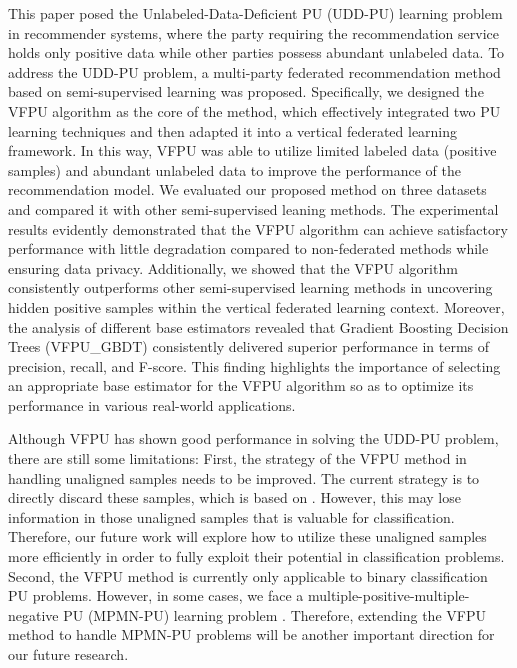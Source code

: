 \documentclass[10pt,journal,compsoc]{IEEEtran}
\begin{document}
This paper posed the Unlabeled-Data-Deficient PU (UDD-PU) learning problem in recommender systems, where the party requiring the recommendation service holds only positive data while other parties possess abundant unlabeled data. To address the UDD-PU problem, a multi-party federated recommendation method based on semi-supervised learning was proposed. Specifically, we designed the VFPU algorithm as the core of the method, which effectively integrated two PU learning techniques and then adapted it into a vertical federated learning framework. In this way, VFPU was able to utilize limited labeled data (positive samples) and abundant unlabeled data to improve the performance of the recommendation model. We evaluated our proposed method on three datasets and compared it with other semi-supervised leaning methods. The experimental results evidently demonstrated that the VFPU algorithm can achieve satisfactory performance with little degradation compared to non-federated methods while ensuring data privacy. Additionally, we showed that the VFPU algorithm consistently outperforms other semi-supervised learning methods in uncovering hidden positive samples within the vertical federated learning context. Moreover, the analysis of different base estimators revealed that Gradient Boosting Decision Trees (VFPU\_GBDT) consistently delivered superior performance in terms of precision, recall, and F-score. This finding highlights the importance of selecting an appropriate base estimator for the VFPU algorithm so as to optimize its performance in various real-world applications.


Although VFPU has shown good performance in solving the UDD-PU problem, there are still some limitations: First, the strategy of the VFPU method in handling unaligned samples needs to be improved. The current strategy is to directly discard these samples, which is based on \cite{yang2019federated}. However, this may lose information in those unaligned samples that is valuable for classification. Therefore, our future work will explore how to utilize these unaligned samples more efficiently in order to fully exploit their potential in classification problems. Second, the VFPU method is currently only applicable to binary classification PU problems. However, in some cases, we face a multiple-positive-multiple-negative PU (MPMN-PU) learning problem \cite{lin2022federated}. Therefore, extending the VFPU method to handle MPMN-PU problems will be another important direction for our future research.
\end{document}
